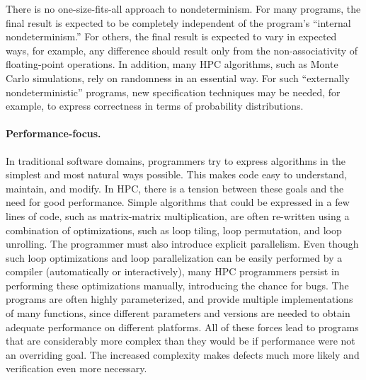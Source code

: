 There is no one-size-fits-all approach to nondeterminism.   For many programs, the final result is expected to be completely independent of the program's ``internal nondeterminism.''  For others, the final result is expected to vary in expected ways, for example, any difference should result only from the non-associativity of floating-point operations.  In addition, many HPC algorithms, such as Monte Carlo simulations, rely on randomness in an essential way.  For such ``externally nondeterministic'' programs, new specification techniques may be needed, for example, to express correctness in terms of probability distributions.


\paragraph{Performance-focus.}
In traditional software domains, programmers try to express algorithms in the simplest and most natural ways possible.  This makes code easy to understand, maintain, and modify.  In HPC, there is a tension between these goals and the need for good performance.  Simple algorithms that could be expressed in a few lines of code, such as matrix-matrix multiplication, are often re-written using a combination of optimizations, such as loop tiling, loop permutation, and loop unrolling.  The programmer must also introduce explicit parallelism.  Even though such loop optimizations and loop parallelization can be easily performed by a compiler (automatically or interactively), many HPC programmers persist in performing these optimizations manually, introducing the chance for bugs.  The programs are often highly parameterized, and provide multiple implementations of many functions, since different parameters and versions are needed to obtain adequate performance on different platforms.  All of these forces lead to programs that are considerably more complex than they would be if performance were not an overriding goal.  The increased complexity makes defects much more likely and verification even more necessary.

